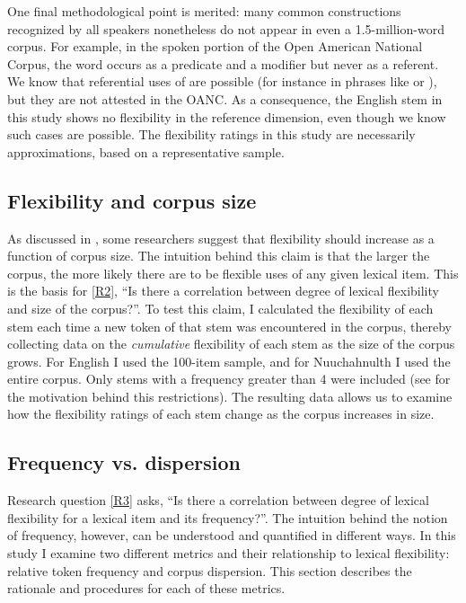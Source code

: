 One final methodological point is merited: many common constructions recognized by all speakers nonetheless do not appear in even a 1.5-million-word corpus. For example, in the spoken portion of the Open American National Corpus, the word  occurs as a predicate and a modifier but never as a referent. We know that referential uses of  are possible (for instance in phrases like  or ), but they are not attested in the OANC. As a consequence, the English stem  in this study shows no flexibility in the reference dimension, even though we know such cases are possible. The flexibility ratings in this study are necessarily approximations, based on a representative sample.

\subsection{Flexibility and corpus size}
\label{sec:3.4.2}

As discussed in , some researchers suggest that flexibility should increase as a function of corpus size. The intuition behind this claim is that the larger the corpus, the more likely there are to be flexible uses of any given lexical item. This is the basis for \ref{R2}, \enquote{Is there a correlation between degree of lexical flexibility and size of the corpus?}. To test this claim, I calculated the flexibility of each stem each time a new token of that stem was encountered in the corpus, thereby collecting data on the \emph{cumulative} flexibility of each stem as the size of the corpus grows. For English I used the 100-item sample, and for Nuuchahnulth I used the entire corpus. Only stems with a frequency greater than 4 were included (see  for the motivation behind this restrictions). The resulting data allows us to examine how the flexibility ratings of each stem change as the corpus increases in size.

\subsection{Frequency vs. dispersion}
\label{sec:3.4.3}

Research question \ref{R3} asks, \enquote{Is there a correlation between degree of lexical flexibility for a lexical item and its frequency?}. The intuition behind the notion of frequency, however, can be understood and quantified in different ways. In this study I examine two different metrics and their relationship to lexical flexibility: relative token frequency and corpus dispersion. This section describes the rationale and procedures for each of these metrics.

